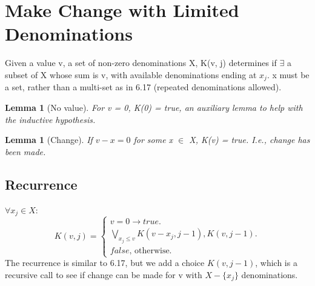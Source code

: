 \documentclass{article}
\newtheorem{lemma}[theorem]{Lemma}
\begin{document}
	
\section{Make Change with Limited Denominations}
Given a value v, a set of non-zero denominations X, K(v, j) determines if $\exists$ a subset of X whose sum is v, with available denominations ending at $x_j$. x must be a set, rather than a multi-set as in 6.17 (repeated denominations allowed).

\begin{lemma} [No value]
\label{bc1}	
For v = 0, K(0) = true, an auxiliary lemma to help with the inductive hypothesis.
\end{lemma}

\begin{lemma} [Change]
\label{bc2}	
If $v - x = 0$ for some x $\in$ X, K(v) = true. I.e., change has been made.
\end{lemma}

\subsection{Recurrence}
$\forall x_j \in X$:\\
\begin{equation}
K(v,j)=			
\begin{cases}
v = 0 \to true.\\	
\underset{x_j \leq v}{\bigvee} K(v-x_j, j-1), K(v, j-1).\\
false \text{, otherwise.}
\end{cases}
\end{equation}
The recurrence is similar to 6.17, but we add a choice $K(v,j-1)$, which is a recursive call to see if change can be made for v with $X - \{x_j\}$ denominations.
\end{document}
